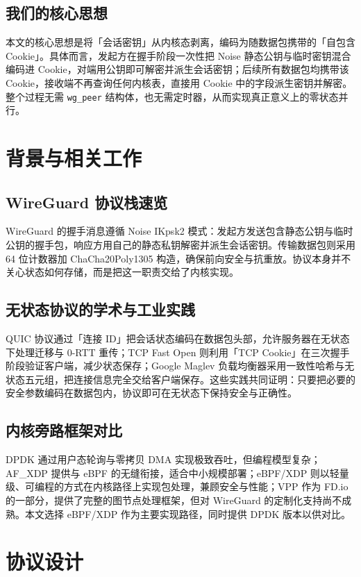 \section{我们的核心思想}
本文的核心思想是将「会话密钥」从内核态剥离，编码为随数据包携带的「自包含 Cookie」。具体而言，发起方在握手阶段一次性把 Noise 静态公钥与临时密钥混合编码进 Cookie，对端用公钥即可解密并派生会话密钥；后续所有数据包均携带该 Cookie，接收端不再查询任何内核表，直接用 Cookie 中的字段派生密钥并解密。整个过程无需 \texttt{wg\_{}peer} 结构体，也无需定时器，从而实现真正意义上的零状态并行。\par
\chapter{背景与相关工作}
\section{WireGuard 协议栈速览}
WireGuard 的握手消息遵循 Noise IKpsk2 模式：发起方发送包含静态公钥与临时公钥的握手包，响应方用自己的静态私钥解密并派生会话密钥。传输数据包则采用 64 位计数器加 ChaCha20Poly1305 构造，确保前向安全与抗重放。协议本身并不关心状态如何存储，而是把这一职责交给了内核实现。\par
\section{无状态协议的学术与工业实践}
QUIC 协议通过「连接 ID」把会话状态编码在数据包头部，允许服务器在无状态下处理迁移与 0-RTT 重传；TCP Fast Open 则利用「TCP Cookie」在三次握手阶段验证客户端，减少状态保存；Google Maglev 负载均衡器采用一致性哈希与无状态五元组，把连接信息完全交给客户端保存。这些实践共同证明：只要把必要的安全参数编码在数据包内，协议即可在无状态下保持安全与正确性。\par
\section{内核旁路框架对比}
DPDK 通过用户态轮询与零拷贝 DMA 实现极致吞吐，但编程模型复杂；AF\_{}XDP 提供与 eBPF 的无缝衔接，适合中小规模部署；eBPF/XDP 则以轻量级、可编程的方式在内核路径上实现包处理，兼顾安全与性能；VPP 作为 FD.io 的一部分，提供了完整的图节点处理框架，但对 WireGuard 的定制化支持尚不成熟。本文选择 eBPF/XDP 作为主要实现路径，同时提供 DPDK 版本以供对比。\par
\chapter{协议设计}
